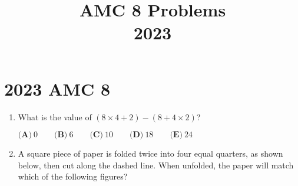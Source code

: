 \documentclass{article}
\title{AMC 8 Problems \\ 2023}
\date{}
\begin{document}
\maketitle\thispagestyle{fancy}\newpage\section*{2023 AMC 8}
\begin{enumerate}[label=\arabic*., itemsep=0.5em]
\item What is the value of \((8 \times 4 + 2) - (8 + 4 \times 2)\)?

\(\textbf{(A)}\ 0 \qquad \textbf{(B)}\ 6 \qquad \textbf{(C)}\ 10 \qquad \textbf{(D)}\ 18 \qquad \textbf{(E)}\ 24\)\par \vspace{0.5em}\item A square piece of paper is folded twice into four equal quarters, as shown below, then cut along the dashed line. When unfolded, the paper will match which of the following figures?


\end{enumerate}
\end{document}
